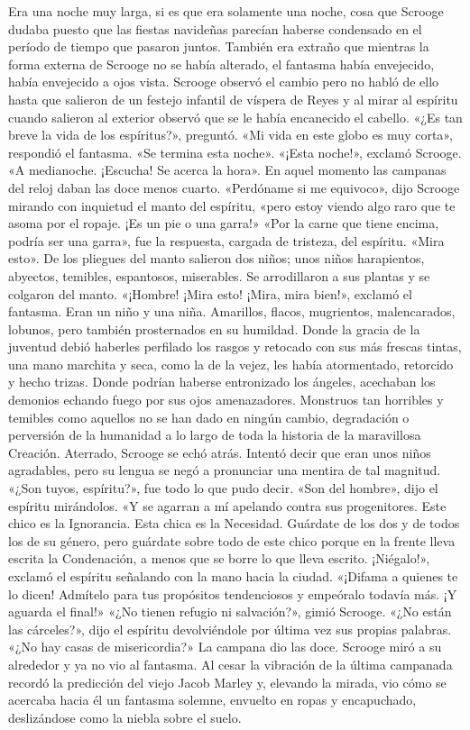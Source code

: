 \documentclass{novela}
\begin{document}
 Era una noche muy larga, si es que era solamente una noche, cosa que Scrooge dudaba puesto que las fiestas navideñas parecían haberse condensado en el período de tiempo que pasaron juntos. También era extraño que mientras la forma externa de Scrooge no se había alterado, el fantasma había envejecido, había envejecido a ojos vista. Scrooge observó el cambio pero no habló de ello hasta que salieron de un festejo infantil de víspera de Reyes y al mirar al espíritu cuando salieron al exterior observó que se le había encanecido el cabello.
 «¿Es tan breve la vida de los espíritus?», preguntó.
 «Mi vida en este globo es muy corta», respondió el fantasma. «Se termina esta noche».
 «¡Esta noche!», exclamó Scrooge.
 «A medianoche. ¡Escucha! Se acerca la hora».
 En aquel momento las campanas del reloj daban las doce menos cuarto.
 «Perdóname si me equivoco», dijo Scrooge mirando con inquietud el manto del espíritu, «pero estoy viendo algo raro que te asoma por el ropaje. ¡Es un pie o una garra!»
 «Por la carne que tiene encima, podría ser una garra», fue la respuesta, cargada de tristeza, del espíritu. «Mira esto».
 De los pliegues del manto salieron dos niños; unos niños harapientos, abyectos, temibles, espantosos, miserables. Se arrodillaron a sus plantas y se colgaron del manto.
 «¡Hombre! ¡Mira esto! ¡Mira, mira bien!», exclamó el fantasma.
 Eran un niño y una niña. Amarillos, flacos, mugrientos, malencarados, lobunos, pero también prosternados en su humildad. Donde la gracia de la juventud debió haberles perfilado los rasgos y retocado con sus más frescas tintas, una mano marchita y seca, como la de la vejez, les había atormentado, retorcido y hecho trizas. Donde podrían haberse entronizado los ángeles, acechaban los demonios echando fuego por sus ojos amenazadores. Monstruos tan horribles y temibles como aquellos no se han dado en ningún cambio, degradación o perversión de la humanidad a lo largo de toda la historia de la maravillosa Creación.
 Aterrado, Scrooge se echó atrás. Intentó decir que eran unos niños agradables, pero su lengua se negó a pronunciar una mentira de tal magnitud.
 «¿Son tuyos, espíritu?», fue todo lo que pudo decir.
 «Son del hombre», dijo el espíritu mirándolos. «Y se agarran a mí apelando contra sus progenitores. Este chico es la Ignorancia. Esta chica es la Necesidad. Guárdate de los dos y de todos los de su género, pero guárdate sobre todo de este chico porque en la frente lleva escrita la Condenación, a menos que se borre lo que lleva escrito. ¡Niégalo!», exclamó el espíritu señalando con la mano hacia la ciudad. «¡Difama a quienes te lo dicen! Admítelo para tus propósitos tendenciosos y empeóralo todavía más. ¡Y aguarda el final!»
 «¿No tienen refugio ni salvación?», gimió Scrooge.
 «¿No están las cárceles?», dijo el espíritu devolviéndole por última vez sus propias palabras. «¿No hay casas de misericordia?»
 La campana dio las doce.
 Scrooge miró a su alrededor y ya no vio al fantasma. Al cesar la vibración de la última campanada recordó la predicción del viejo Jacob Marley y, elevando la mirada, vio cómo se acercaba hacia él un fantasma solemne, envuelto en ropas y encapuchado, deslizándose como la niebla sobre el suelo.
\end{document}
